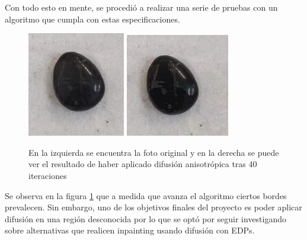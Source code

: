 \documentclass[assd_tpf_lineasinvest.tex]{subfiles}
\begin{document}
Con todo esto en mente, se procedió a realizar una serie de pruebas con un algoritmo que cumpla con estas especificaciones.
\begin{figure}[H]
\begin{centering}
\includegraphics[scale=.98]{diforig.jpeg}
\includegraphics[scale=1]{dif40it.jpeg}
\par\end{centering}
\caption{En la izquierda se encuentra la foto original y en la derecha se puede ver el resultado de haber aplicado difusión anisotrópica tras 40 iteraciones}
\label{fig:compAnisotrop}
\end{figure}
Se observa en la figura \ref{fig:compAnisotrop} que a medida que avanza el algoritmo ciertos bordes prevalecen. Sin embargo, uno de los objetivos finales del proyecto es poder aplicar difusión en una región desconocida por lo que se optó por seguir investigando sobre alternativas que realicen inpainting usando  difusión con EDPs.
\end{document}
